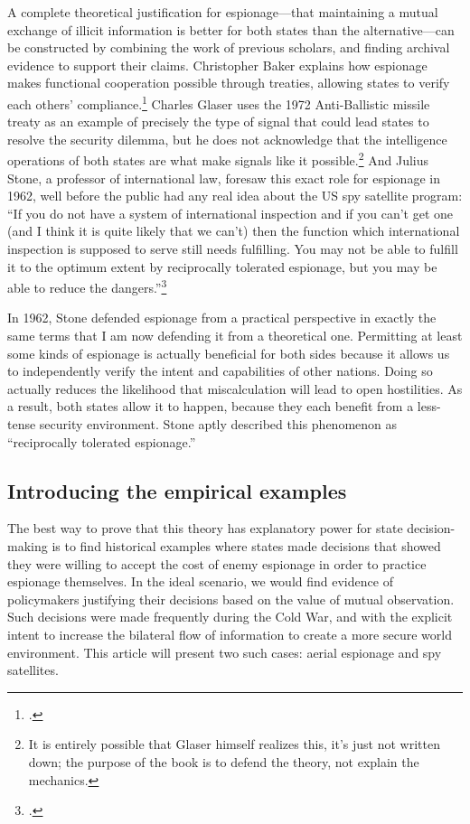 \documentclass[14pt]{extarticle}
\begin{document}
A complete theoretical justification for espionage---that maintaining a mutual exchange of illicit information is better for both states than the alternative---can be constructed by combining the work of previous scholars, and finding archival evidence to support their claims. Christopher Baker explains how espionage makes functional cooperation possible through treaties, allowing states to verify each others' compliance.\footcite[p.~6]{baker_tolerance_2004} Charles Glaser uses the 1972 Anti-Ballistic missile treaty as an example of precisely the type of signal that could lead states to resolve the security dilemma, but he does not acknowledge that the intelligence operations of both states are what make signals like it possible.\footnote{It is entirely possible that Glaser himself realizes this, it's just not written down; the purpose of the book is to defend the theory, not explain the mechanics.} And Julius Stone, a professor of international law, foresaw this exact role for espionage in 1962, well before the public had any real idea about the US spy satellite program: \enquote{If you do not have a system of international inspection and if you can't get one (and I think it is quite likely that we can't) then the function which international inspection is supposed to serve still needs fulfilling. You may not be able to fulfill it to the optimum extent by reciprocally tolerated espionage, but you may be able to reduce the dangers.}\footcite[p.~41]{stone_legal_1962}

In 1962, Stone defended espionage from a practical perspective in exactly the same terms that I am now defending it from a theoretical one. Permitting at least some kinds of espionage is actually beneficial for both sides because it allows us to independently verify the intent and capabilities of other nations. Doing so actually reduces the likelihood that miscalculation will lead to open hostilities. As a result, both states allow it to happen, because they each benefit from a less-tense security environment. Stone aptly described this phenomenon as \enquote{reciprocally tolerated espionage.}

\subsection{Introducing the empirical examples}

The best way to prove that this theory has explanatory power for state decision-making is to find historical examples where states made decisions that showed they were willing to accept the cost of enemy espionage in order to practice espionage themselves. In the ideal scenario, we would find evidence of policymakers justifying their decisions based on the value of mutual observation. Such decisions were made frequently during the Cold War, and with the explicit intent to increase the bilateral flow of information to create a more secure world environment. This article will present two such cases: aerial espionage and spy satellites.
\end{document}
